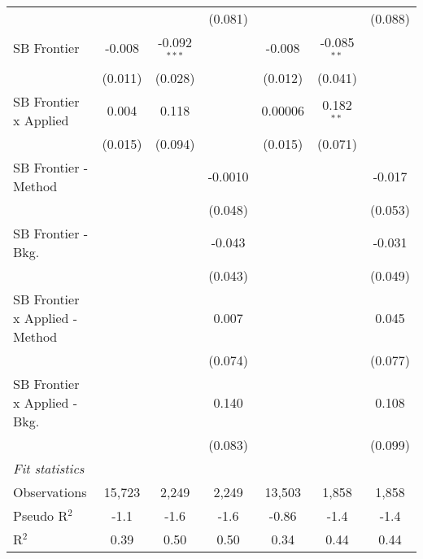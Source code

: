 \begin{tabular}{lcccccc}
                                  &         &                & (0.081) &              &               & (0.088)\\   
   SB Frontier                    & -0.008  & -0.092$^{***}$ &         & -0.008       & -0.085$^{**}$ &   \\   
                                  & (0.011) & (0.028)        &         & (0.012)      & (0.041)       &   \\   
   SB Frontier x Applied          & 0.004   & 0.118          &         & 0.00006      & 0.182$^{**}$  &   \\   
                                  & (0.015) & (0.094)        &         & (0.015)      & (0.071)       &   \\   
   SB Frontier - Method           &         &                & -0.0010 &              &               & -0.017\\   
                                  &         &                & (0.048) &              &               & (0.053)\\   
   SB Frontier - Bkg.             &         &                & -0.043  &              &               & -0.031\\   
                                  &         &                & (0.043) &              &               & (0.049)\\   
   SB Frontier x Applied - Method &         &                & 0.007   &              &               & 0.045\\   
                                  &         &                & (0.074) &              &               & (0.077)\\   
   SB Frontier x Applied - Bkg.   &         &                & 0.140   &              &               & 0.108\\   
                                  &         &                & (0.083) &              &               & (0.099)\\   
   \midrule
   \emph{Fit statistics}\\
   Observations                   & 15,723  & 2,249          & 2,249   & 13,503       & 1,858         & 1,858\\  
   Pseudo R$^2$                   & -1.1    & -1.6           & -1.6    & -0.86        & -1.4          & -1.4\\  
   R$^2$                          & 0.39    & 0.50           & 0.50    & 0.34         & 0.44          & 0.44\\  
   

\end{tabular}
